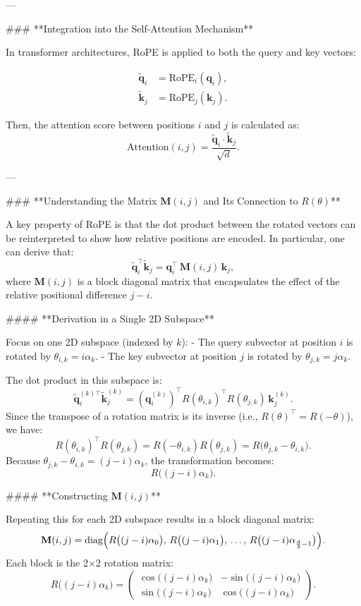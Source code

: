 ---

### **Integration into the Self-Attention Mechanism**

In transformer architectures, RoPE is applied to both the query and key vectors:

\[
\begin{aligned}
\tilde{\mathbf{q}}_i &= \text{RoPE}_i(\mathbf{q}_i), \\
\tilde{\mathbf{k}}_j &= \text{RoPE}_j(\mathbf{k}_j).
\end{aligned}
\]

Then, the attention score between positions \(i\) and \(j\) is calculated as:
\[
\text{Attention}(i, j) = \frac{\tilde{\mathbf{q}}_i \cdot \tilde{\mathbf{k}}_j}{\sqrt{d}}.
\]

---

### **Understanding the Matrix \(\mathbf{M}(i,j)\) and Its Connection to \(R(\theta)\)**

A key property of RoPE is that the dot product between the rotated vectors can be reinterpreted to show how relative positions are encoded. In particular, one can derive that:
\[
\tilde{\mathbf{q}}_i^\top \tilde{\mathbf{k}}_j = \mathbf{q}_i^\top\, \mathbf{M}(i,j)\, \mathbf{k}_j,
\]
where \(\mathbf{M}(i,j)\) is a block diagonal matrix that encapsulates the effect of the relative positional difference \(j-i\).

#### **Derivation in a Single 2D Subspace**

Focus on one 2D subspace (indexed by \(k\)):
- The query subvector at position \(i\) is rotated by \(\theta_{i,k} = i\alpha_k\).
- The key subvector at position \(j\) is rotated by \(\theta_{j,k} = j\alpha_k\).

The dot product in this subspace is:
\[
\tilde{\mathbf{q}}_i^{(k)\top} \tilde{\mathbf{k}}_j^{(k)} 
= \left(\mathbf{q}_i^{(k)}\right)^\top R(\theta_{i,k})^\top R(\theta_{j,k}) \, \mathbf{k}_j^{(k)}.
\]
Since the transpose of a rotation matrix is its inverse (i.e., \(R(\theta)^\top = R(-\theta)\)), we have:
\[
R(\theta_{i,k})^\top R(\theta_{j,k}) = R(-\theta_{i,k})R(\theta_{j,k}) = R\bigl(\theta_{j,k} - \theta_{i,k}\bigr).
\]
Because \(\theta_{j,k} - \theta_{i,k} = (j-i)\alpha_k\), the transformation becomes:
\[
R\bigl((j-i)\alpha_k\bigr).
\]

#### **Constructing \(\mathbf{M}(i,j)\)**

Repeating this for each 2D subspace results in a block diagonal matrix:
\[
\mathbf{M}(i,j) = \text{diag}\Bigl(
R\bigl((j-i)\alpha_0\bigr),\,
R\bigl((j-i)\alpha_1\bigr),\,
\ldots,\,
R\bigl((j-i)\alpha_{\frac{d}{2}-1}\bigr)
\Bigr).
\]
Each block is the 2×2 rotation matrix:
\[
R\bigl((j-i)\alpha_k\bigr)
= \begin{pmatrix}
\cos\bigl((j-i)\alpha_k\bigr) & -\sin\bigl((j-i)\alpha_k\bigr) \\
\sin\bigl((j-i)\alpha_k\bigr) & \cos\bigl((j-i)\alpha_k\bigr)
\end{pmatrix}.
\]

